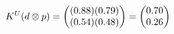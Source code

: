 \documentclass[preview]{standalone}
\begin{document}
\begin{align*}
\special{dvisvgm:raw <g id='unique000'>}K^U(d \otimes p) = \begin{pmatrix} (0.88)(0.79) \\ (0.54)(0.48) \end{pmatrix} = \begin{pmatrix} 0.70 \\ 0.26 \end{pmatrix}\special{dvisvgm:raw </g>}
\end{align*}
\end{document}
